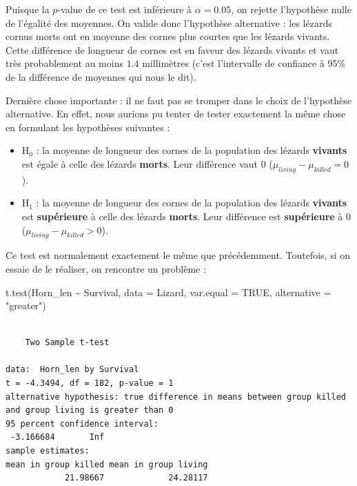 \documentclass[
  a4paper,
  DIV=11,
  numbers=noendperiod,
  oneside]{scrreprt}
\newenvironment{Shaded}{}{}
\newcommand{\AttributeTok}[1]{\textcolor[rgb]{0.84,0.23,0.29}{#1}}
\newcommand{\ConstantTok}[1]{\textcolor[rgb]{0.00,0.36,0.77}{#1}}
\newcommand{\FunctionTok}[1]{\textcolor[rgb]{0.44,0.26,0.76}{#1}}
\newcommand{\NormalTok}[1]{\textcolor[rgb]{0.14,0.16,0.18}{#1}}
\newcommand{\SpecialCharTok}[1]{\textcolor[rgb]{0.00,0.36,0.77}{#1}}
\newcommand{\StringTok}[1]{\textcolor[rgb]{0.01,0.18,0.38}{#1}}
\providecommand{\tightlist}{%
  \setlength{\itemsep}{0pt}\setlength{\parskip}{0pt}}\usepackage{longtable,booktabs,array}
\begin{document}
Puisque la \(p\)-value de ce test est inférieure à \(\alpha = 0.05\), on
rejette l'hypothèse nulle de l'égalité des moyennes. On valide donc
l'hypothèse alternative : les lézards cornus morts ont en moyenne des
cornes plus courtes que les lézards vivants. Cette différence de
longueur de cornes est en faveur des lézards vivants et vaut très
probablement au moins \(1.4\) millimètres (c'est l'intervalle de
confiance à 95\% de la différence de moyennes qui nous le dit).

Dernière chose importante : il ne faut pas se tromper dans le choix de
l'hypothèse alternative. En effet, nous aurions pu tenter de tester
exactement la même chose en formulant les hypothèses suivantes :

\begin{itemize}
\tightlist
\item
  H\(_0\) : la moyenne de longueur des cornes de la population des
  lézards \textbf{vivants} est égale à celle des lézards \textbf{morts}.
  Leur différence vaut 0 (\(\mu_{living}-\mu_{killed} = 0\)).
\item
  H\(_1\) : la moyenne de longueur des cornes de la population des
  lézards \textbf{vivants} est \textbf{supérieure} à celle des lézards
  \textbf{morts}. Leur différence est \textbf{supérieure} à 0
  (\(\mu_{living}-\mu_{killed} > 0\)).
\end{itemize}

Ce test est normalement exactement le même que précédemment. Toutefois,
si on essaie de le réaliser, on rencontre un problème :

\begin{Shaded}
\begin{Highlighting}[]
\FunctionTok{t.test}\NormalTok{(Horn\_len }\SpecialCharTok{\textasciitilde{}}\NormalTok{ Survival, }\AttributeTok{data =}\NormalTok{ Lizard, }\AttributeTok{var.equal =} \ConstantTok{TRUE}\NormalTok{,}
       \AttributeTok{alternative =} \StringTok{"greater"}\NormalTok{)}
\end{Highlighting}
\end{Shaded}

\begin{verbatim}

    Two Sample t-test

data:  Horn_len by Survival
t = -4.3494, df = 182, p-value = 1
alternative hypothesis: true difference in means between group killed and group living is greater than 0
95 percent confidence interval:
 -3.166684       Inf
sample estimates:
mean in group killed mean in group living 
            21.98667             24.28117 
\end{verbatim}
\end{document}
